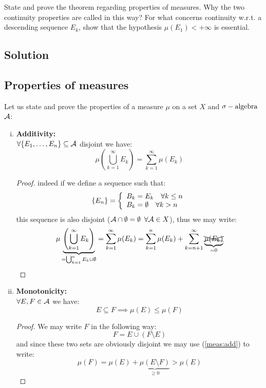 \question
State and prove the theorem regarding properties of measures. Why the two continuity properties
are called in this way? For what concerns continuity w.r.t. a descending sequence ${E_k}$, show that
the hypothesis $\mu(E_1) < +\infty$ is essential.

\subsection*{Solution}
\subsection{Properties of measures}
Let us state and prove the properties of a measure $\mu$ on a set $X$ and $\sigma-\text{algebra}$ $\mathcal{A}$:
\begin{enumerate}[i)]
    \item \label{meas:add} \textbf{Additivity:} \\
    $\forall \{ E_1, \dots, E_n \} \subseteq \mathcal{A}$ disjoint we have:
    \[
        \mu\left( \bigcup_{k=1}^{\infty} E_k \right) = \sum_{k=1}^{\infty} \mu(E_k)
    \]
    \begin{proof}
    indeed if we define a sequence such that:
    \[
        \{ E_n \} = \left\{ \begin{array}{l}
            B_k = E_k \quad \forall k \leq n\\
            B_k = \emptyset \quad \forall k > n
        \end{array} \right.
    \]
    this sequence is also disjoint ($\mathcal{A}\cap\emptyset = \emptyset$ $\forall \mathcal{A}\in X$), thus we may write:
    \[
        \mu \underbrace{ \left( \bigcup_{k=1}^{\infty} E_k \right) }_{=\bigcup_{k=1}^{n} E_k \cup \emptyset}
         = \sum_{k=1}^{\infty} \mu(E_k) = \sum_{k=1}^{n} \mu(E_k) + \sum_{k=n+1}^{\infty} \underbrace{\overset{\text{\normalsize}}{\xcancel{\mu(E_k)}}}_{=0}
    \]
    \end{proof}

    \item \label{meas:mono} \textbf{Monotonicity:} \\
    $\forall E,F \in \mathcal{A}$ we have:
    \[
        E\subseteq F \implies \mu(E) \leq \mu(F)    
    \]
    \begin{proof}
    We may write $F$ in the following way:
    \[
        F=E\cup (F \setminus E) 
    \]
    and since these two sets are obviously disjoint we may use (\ref{meas:add}) to write:
    \[
        \mu(F) = \mu(E)+\underbrace{\mu(E \setminus F)}_{\geq 0} > \mu(E)
    \]
    \end{proof}
    

\end{enumerate}
